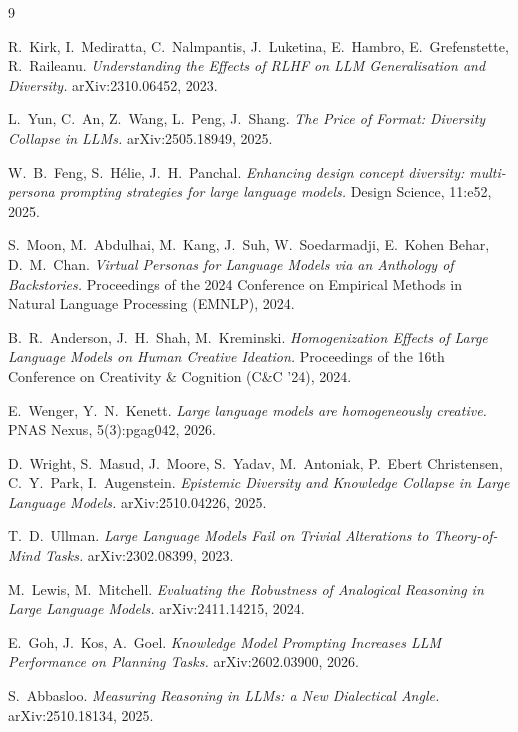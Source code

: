 \documentclass[11pt]{article}
\begin{document}

\begin{thebibliography}{9}

R.\ Kirk, I.\ Mediratta, C.\ Nalmpantis, J.\ Luketina, E.\ Hambro, E.\ Grefenstette, R.\ Raileanu.
\emph{Understanding the Effects of RLHF on LLM Generalisation and Diversity.}
arXiv:2310.06452, 2023.

L.\ Yun, C.\ An, Z.\ Wang, L.\ Peng, J.\ Shang.
\emph{The Price of Format: Diversity Collapse in LLMs.}
arXiv:2505.18949, 2025.

W.\ B.\ Feng, S.\ H\'elie, J.\ H.\ Panchal.
\emph{Enhancing design concept diversity: multi-persona prompting strategies for large language models.}
Design Science, 11:e52, 2025.

S.\ Moon, M.\ Abdulhai, M.\ Kang, J.\ Suh, W.\ Soedarmadji, E.\ Kohen Behar, D.\ M.\ Chan.
\emph{Virtual Personas for Language Models via an Anthology of Backstories.}
Proceedings of the 2024 Conference on Empirical Methods in Natural Language Processing (EMNLP), 2024.

B.\ R.\ Anderson, J.\ H.\ Shah, M.\ Kreminski.
\emph{Homogenization Effects of Large Language Models on Human Creative Ideation.}
Proceedings of the 16th Conference on Creativity \& Cognition (C\&C '24), 2024.

E.\ Wenger, Y.\ N.\ Kenett.
\emph{Large language models are homogeneously creative.}
PNAS Nexus, 5(3):pgag042, 2026.

D.\ Wright, S.\ Masud, J.\ Moore, S.\ Yadav, M.\ Antoniak, P.\ Ebert Christensen, C.\ Y.\ Park, I.\ Augenstein.
\emph{Epistemic Diversity and Knowledge Collapse in Large Language Models.}
arXiv:2510.04226, 2025.

T.\ D.\ Ullman.
\emph{Large Language Models Fail on Trivial Alterations to Theory-of-Mind Tasks.}
arXiv:2302.08399, 2023.

M.\ Lewis, M.\ Mitchell.
\emph{Evaluating the Robustness of Analogical Reasoning in Large Language Models.}
arXiv:2411.14215, 2024.

E.\ Goh, J.\ Kos, A.\ Goel.
\emph{Knowledge Model Prompting Increases LLM Performance on Planning Tasks.}
arXiv:2602.03900, 2026.

S.\ Abbasloo.
\emph{Measuring Reasoning in LLMs: a New Dialectical Angle.}
arXiv:2510.18134, 2025.

\end{thebibliography}
\end{document}
